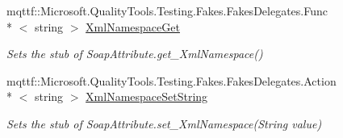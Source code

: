 \begin{DoxyCompactItemize}
mqttf\-::\-Microsoft.\-Quality\-Tools.\-Testing.\-Fakes.\-Fakes\-Delegates.\-Func\\*
$<$ string $>$ \hyperlink{class_system_1_1_runtime_1_1_remoting_1_1_metadata_1_1_fakes_1_1_stub_soap_attribute_a58e543455b94ab15aef3b5501abb5d0c}{Xml\-Namespace\-Get}
\begin{DoxyCompactList}\small\item\em Sets the stub of Soap\-Attribute.\-get\-\_\-\-Xml\-Namespace()\end{DoxyCompactList}\item 
mqttf\-::\-Microsoft.\-Quality\-Tools.\-Testing.\-Fakes.\-Fakes\-Delegates.\-Action\\*
$<$ string $>$ \hyperlink{class_system_1_1_runtime_1_1_remoting_1_1_metadata_1_1_fakes_1_1_stub_soap_attribute_adfa5bf590324df49808a67b998e1066e}{Xml\-Namespace\-Set\-String}
\begin{DoxyCompactList}\small\item\em Sets the stub of Soap\-Attribute.\-set\-\_\-\-Xml\-Namespace(\-String value)\end{DoxyCompactList}\end{DoxyCompactItemize}
